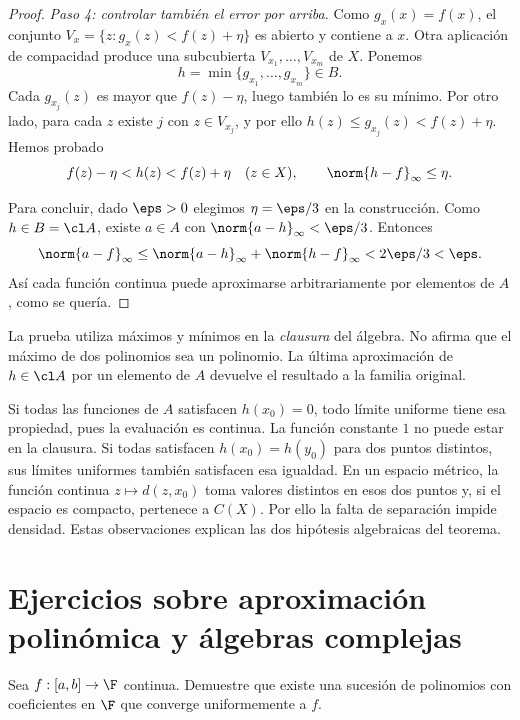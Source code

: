 \begin{proof}
\emph{Paso 4: controlar también el error por arriba.}
Como $g_x(x)=f(x)$, el conjunto
$V_x=\{z:g_x(z)<f(z)+\eta\}$ es abierto y contiene a $x$. Otra aplicación de compacidad produce una subcubierta $V_{x_1},\ldots,V_{x_m}$ de $X$. Ponemos
\[
 h=\min\{g_{x_1},\ldots,g_{x_m}\}\in B.
\]
Cada $g_{x_j}(z)$ es mayor que $f(z)-\eta$, luego también lo es su mínimo. Por otro lado, para cada $z$ existe $j$ con $z\in V_{x_j}$, y por ello
$h(z)\le g_{x_j}(z)<f(z)+\eta$. Hemos probado
\[
 f(z)-\eta<h(z)<f(z)+\eta\quad(z\in X),
 \qquad\norm{h-f}_\infty\le\eta.
\]

Para concluir, dado $\eps>0$ elegimos $\eta=\eps/3$ en la construcción. Como $h\in B=\cl A$, existe $a\in A$ con $\norm{a-h}_\infty<\eps/3$. Entonces
\[
 \norm{a-f}_\infty\le\norm{a-h}_\infty+\norm{h-f}_\infty
 <2\eps/3<\eps.
\]
Así cada función continua puede aproximarse arbitrariamente por elementos de $A$, como se quería.
\end{proof}

La prueba utiliza máximos y mínimos en la \emph{clausura} del álgebra. No afirma que el máximo de dos polinomios sea un polinomio. La última aproximación de $h\in\cl A$ por un elemento de $A$ devuelve el resultado a la familia original.

\begin{ejemplo}
Si todas las funciones de $A$ satisfacen $h(x_0)=0$, todo límite uniforme tiene esa propiedad, pues la evaluación es continua. La función constante $1$ no puede estar en la clausura. Si todas satisfacen $h(x_0)=h(y_0)$ para dos puntos distintos, sus límites uniformes también satisfacen esa igualdad. En un espacio métrico, la función continua $z\mapsto d(z,x_0)$ toma valores distintos en esos dos puntos y, si el espacio es compacto, pertenece a $C(X)$. Por ello la falta de separación impide densidad. Estas observaciones explican las dos hipótesis algebraicas del teorema.
\end{ejemplo}

\section{Ejercicios sobre aproximación polinómica y álgebras complejas}
\begin{ejercicio}\label{ej:lectura-28-1}
Sea $f:[a,b]\to\F$ continua. Demuestre que existe una sucesión de polinomios con coeficientes en $\F$ que converge uniformemente a $f$.
\end{ejercicio}


